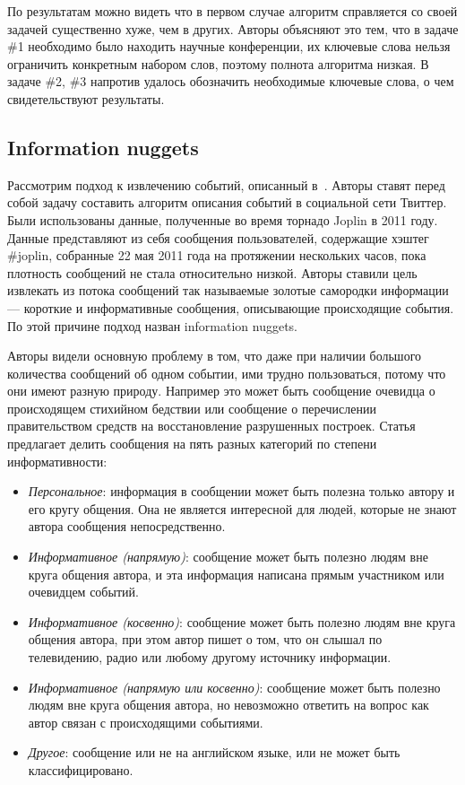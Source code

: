 \documentclass[12pt, a4paper]{article}
\begin{document}
	По результатам можно видеть что в первом случае алгоритм справляется со своей задачей существенно хуже, чем в других. Авторы объясняют это тем, что в задаче \#1 необходимо было находить научные конференции, их ключевые слова нельзя ограничить конкретным набором слов, поэтому полнота алгоритма низкая. В задаче \#2, \#3 напротив удалось обозначить необходимые ключевые слова, о чем свидетельствуют результаты.
	
	\subsection{Information nuggets}
	Рассмотрим подход к извлечению событий, описанный в~\cite{nuggets}. Авторы ставят перед собой задачу составить алгоритм описания событий в социальной сети Твиттер. Были использованы данные, полученные во время торнадо Joplin в 2011 году. Данные представляют из себя сообщения пользователей, содержащие хэштег \#joplin, собранные 22 мая 2011 года на протяжении нескольких часов, пока плотность сообщений не стала относительно низкой. Авторы ставили цель извлекать из потока сообщений так называемые золотые самородки информации --- короткие и информативные сообщения, описывающие происходящие события. По этой причине подход назван information nuggets.
	
	Авторы видели основную проблему в том, что даже при наличии большого количества сообщений об одном событии, ими трудно пользоваться, потому что они имеют разную природу. Например это может быть сообщение очевидца о происходящем стихийном бедствии или сообщение о перечислении правительством средств на восстановление разрушенных построек. Статья предлагает делить сообщения на пять разных категорий по степени информативности:
	\begin{itemize}
	\item\emph{Персональное}:
	информация в сообщении может быть полезна только автору и его кругу общения. Она не является интересной для людей, которые не знают автора сообщения непосредственно.
	\item\emph{Информативное (напрямую)}:
	сообщение может быть полезно людям вне круга общения автора, и эта информация написана прямым участником или очевидцем событий.
	\item\emph{Информативное (косвенно)}:
	сообщение может быть полезно людям вне круга общения автора, при этом автор пишет о том, что он слышал по телевидению, радио или любому другому источнику информации.
	\item\emph{Информативное (напрямую или косвенно)}:
	сообщение может быть полезно людям вне круга общения автора, но невозможно ответить на вопрос как автор связан с происходящими событиями.
	\item\emph{Другое}:
	сообщение или не на английском языке, или не может быть классифицировано.
	\end{itemize}
	
\end{document}
